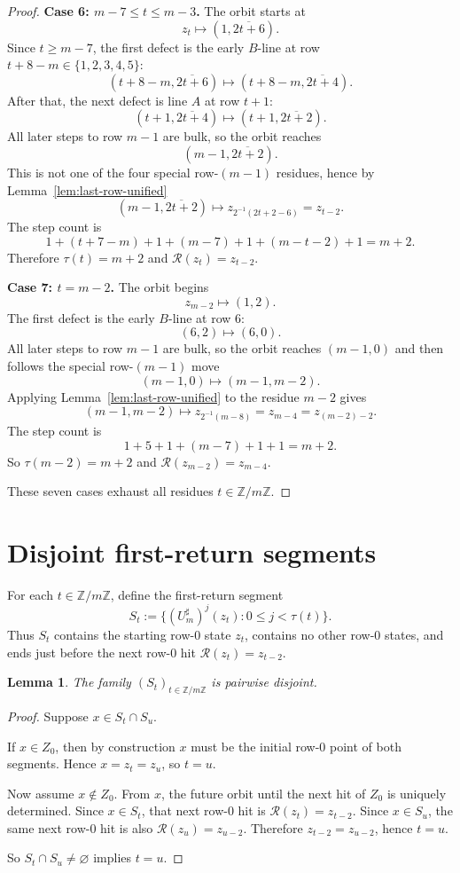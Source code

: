 \documentclass[11pt]{article}
\newtheorem{lemma}[theorem]{Lemma}
\newcommand{\Z}{\mathbb Z}
\newcommand{\Um}{U_m^{\sharp}}
\newcommand{\half}{2^{-1}}
\begin{document}
\begin{proof}
\smallskip
\noindent\textbf{Case 6: $m-7\le t\le m-3$.}
The orbit starts at
\[
z_t\mapsto (1,\overline{2t+6}).
\]
Since $t\ge m-7$, the first defect is the early $B$-line at row $t+8-m\in\{1,
2,3,4,5\}$:
\[
(t+8-m,\overline{2t+6})\mapsto (t+8-m,\overline{2t+4}).
\]
After that, the next defect is line $A$ at row $t+1$:
\[
(t+1,\overline{2t+4})\mapsto (t+1,\overline{2t+2}).
\]
All later steps to row $m-1$ are bulk, so the orbit reaches
\[
(m-1,\overline{2t+2}).
\]
This is not one of the four special row-$(m-1)$ residues, hence by
Lemma~\ref{lem:last-row-unified}
\[
(m-1,\overline{2t+2})\mapsto z_{\half(2t+2-6)} = z_{t-2}.
\]
The step count is
\[
1+(t+7-m)+1+(m-7)+1+(m-t-2)+1 = m+2.
\]
Therefore $\tau(t)=m+2$ and $\mathcal R(z_t)=z_{t-2}$.

\smallskip
\noindent\textbf{Case 7: $t=m-2$.}
The orbit begins
\[
z_{m-2}\mapsto (1,2).
\]
The first defect is the early $B$-line at row $6$:
\[
(6,2)\mapsto (6,0).
\]
All later steps to row $m-1$ are bulk, so the orbit reaches $(m-1,0)$ and then
follows the special row-$(m-1)$ move
\[
(m-1,0)\mapsto (m-1,m-2).
\]
Applying Lemma~\ref{lem:last-row-unified} to the residue $m-2$ gives
\[
(m-1,m-2)\mapsto z_{\half(m-8)} = z_{m-4}=z_{(m-2)-2}.
\]
The step count is
\[
1+5+1+(m-7)+1+1 = m+2.
\]
So $\tau(m-2)=m+2$ and $\mathcal R(z_{m-2})=z_{m-4}$.

These seven cases exhaust all residues $t\in\Z/m\Z$.
\end{proof}

\section{Disjoint first-return segments}

For each $t\in\Z/m\Z$, define the first-return segment
\[
S_t:=\{(\Um)^j(z_t):0\le j<\tau(t)\}.
\]
Thus $S_t$ contains the starting row-$0$ state $z_t$, contains no other
row-$0$ states, and ends just before the next row-$0$ hit
$\mathcal R(z_t)=z_{t-2}$.

\begin{lemma}\label{lem:segments-disjoint}
The family $(S_t)_{t\in\Z/m\Z}$ is pairwise disjoint.
\end{lemma}

\begin{proof}
Suppose $x\in S_t\cap S_u$.

If $x\in Z_0$, then by construction $x$ must be the initial row-$0$ point of
both segments. Hence $x=z_t=z_u$, so $t=u$.

Now assume $x\notin Z_0$. From $x$, the future orbit until the next hit of
$Z_0$ is uniquely determined. Since $x\in S_t$, that next row-$0$ hit is
$\mathcal R(z_t)=z_{t-2}$. Since $x\in S_u$, the same next row-$0$ hit is also
$\mathcal R(z_u)=z_{u-2}$. Therefore $z_{t-2}=z_{u-2}$, hence $t=u$.

So $S_t\cap S_u\ne\varnothing$ implies $t=u$.
\end{proof}
\end{document}
